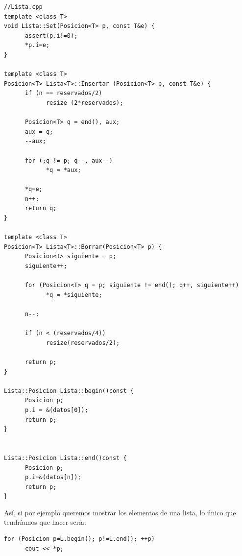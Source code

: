 \documentclass[10pt,a4paper,spanish]{report}
\begin{document}
\begin{verbatim}
//Lista.cpp
template <class T>
void Lista::Set(Posicion<T> p, const T&e) {
      assert(p.i!=0);
      *p.i=e;
}

template <class T>
Posicion<T> Lista<T>::Insertar (Posicion<T> p, const T&e) {
      if (n == reservados/2)
            resize (2*reservados);

      Posicion<T> q = end(), aux;
      aux = q;
      --aux;

      for (;q != p; q--, aux--)
            *q = *aux;

      *q=e;
      n++;
      return q;
}

template <class T>
Posicion<T> Lista<T>::Borrar(Posicion<T> p) {
      Posicion<T> siguiente = p;
      siguiente++;

      for (Posicion<T> q = p; siguiente != end(); q++, siguiente++)
            *q = *siguiente;

      n--;

      if (n < (reservados/4))
            resize(reservados/2);

      return p;
}

Lista::Posicion Lista::begin()const {
      Posicion p;
      p.i = &(datos[0]);
      return p;
}


Lista::Posicion Lista::end()const {
      Posicion p;
      p.i=&(datos[n]);
      return p;
}
\end{verbatim}

\noindent
Así, si por ejemplo queremos mostrar los elementos de una lista, lo único que tendríamos que hacer sería:
\begin{verbatim}
for (Posicion p=L.begin(); p!=L.end(); ++p)
      cout << *p;
\end{verbatim}
\end{document}
